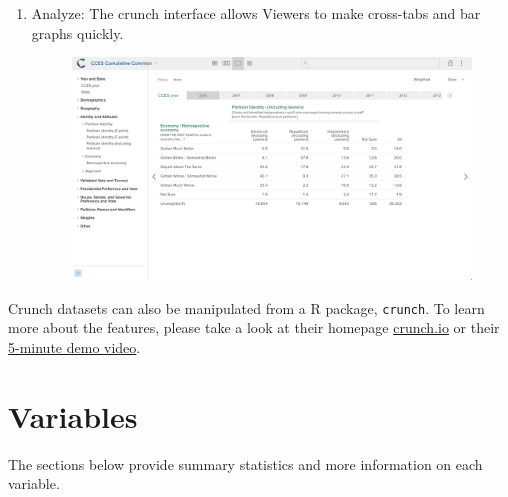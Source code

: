 \documentclass[10pt,article,oneside]{memoir}
\theoremstyle{definition}
\begin{document}
\begin{enumerate}
\def\labelenumi{\arabic{enumi}.}
\setcounter{enumi}{2}
\tightlist
\item
  Analyze: The crunch interface allows Viewers to make cross-tabs and
  bar graphs quickly.\\

  \begin{figure}[H]
  \centering
  \centerline{\includegraphics[width=1.05\linewidth]{02_crunch_tab.png}}
  \end{figure}
\end{enumerate}

Crunch datasets can also be manipulated from a R package,
\texttt{crunch}. To learn more about the features, please take a look at
their homepage \href{https://crunch.io}{crunch.io} or their
\href{https://www.youtube.com/watch?v=zA7N_Q1EpSs}{5-minute demo video}.

\newpage

\hypertarget{variables}{%
\section{Variables}\label{variables}}

The sections below provide summary statistics and more information on
each variable.
\end{document}
